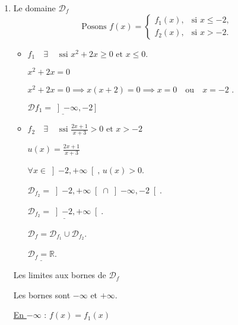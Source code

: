 \documentclass[12pt,a4paper]{article}
\begin{document}
\begin{enumerate}
    \item Le domaine \( \mathcal{D}_f \)
\[ \text{ Posons }
f(x) =
\begin{cases}
f_1(x), & \text{si } x \leq -2, \\
f_2(x), & \text{si } x > -2.
\end{cases}
\]

\begin{itemize}
    \item \( f_1 \quad  \exists \quad \text{ ssi }  x^2 + 2x \geq 0  \text{ et } x\leq 0 \).
    
             \( x^2 + 2x = 0 \) 
            
           \( x^2 + 2x = 0 \implies x(x + 2) = 0 \implies x = 0 \quad \text{ou} \quad x = -2 \) .
            \begin{center}
            \end{center}
            \( \underline{\mathcal{D}f_1 = \left]-\infty, -2\right]} \)

    \item  \( f_2  \quad  \exists \quad \text{ ssi } \frac{2x + 1}{x + 3} > 0 \text{ et } x > -2 \)

         \( u(x)=\frac{2x + 1}{x + 3} \)

         \( \forall x \in \left]-2, +\infty\right[, \, u(x) > 0 \).

         \( \mathcal{D}_{f_2} = \left]-2, +\infty\right[ \cap \left]-\infty, -2\right[ \).

        \( \underline{\mathcal{D}_{f_2} = \left]-2, +\infty\right[} \).

         \( \mathcal{D}_f = \mathcal{D}_{f_1} \cup \mathcal{D}_{f_2} \).

         \( \underline{\boxed{\mathcal{D}_f = \mathbb{R}}} \).

\end{itemize}
Les limites aux bornes de \( \mathcal{D}_f \)

\noindent Les bornes sont $-\infty$ et $+\infty$.

\underline{En $-\infty$} : $f(x) = f_1(x)$


\end{enumerate}
\end{document}
